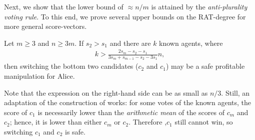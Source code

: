 Next, we show that the lower bound of $\approx n/m$ is attained by the \emph{anti-plurality voting rule}. To this end, we prove several upper bounds on the RAT-degree for more general score-vectors. 


\iffalse %
\begin{lemmarep}
\label{lem:b:s2>s1}
Let $m\geq 3$ and $n\geq 3m$.
If $s_2 > s_1$ and there are $k$ known agents,
where 
\begin{align*}
k > \frac{2 s_m - s_2 - s_1}    {3 s_m + s_{m-1} - s_2 - 3 s_1} n,
\end{align*}
then
switching the bottom two candidates ($c_2$ and $c_1$) may be a safe profitable manipulation for Alice.
\end{lemmarep}
\begin{proofsketch}
Note that the expression on the right-hand side can be as small as $n/3$. 
Still, an adaptation of the construction of  works: for some votes of the known agents,
the score of $c_1$ is necessarily lower than the \emph{arithmetic mean} of the scores of $c_m$ and $c_2$; hence, it is lower than either $c_m$ or $c_2$.
Therefore ,$c_1$ still cannot win, so switching $c_1$ and $c_2$ is safe.
\end{proofsketch}
